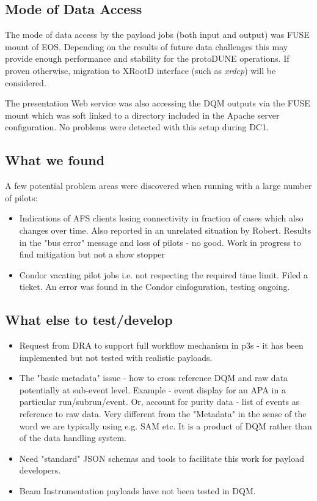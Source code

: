 \documentclass[pdftex,12pt,letter]{article}
\newcommand{\pd}{protoDUNE\xspace}
\begin{document}
\subsection{Mode of Data Access}
The mode of data access by the payload jobs (both input and output) was FUSE mount of EOS.
Depending on the results of future data challenges this may provide enough performance and
stability for the \pd operations. If proven otherwise, migration to XRootD interface (such as \textit{xrdcp})
will be considered.

The presentation Web service was also accessing the DQM outputs via the FUSE mount which was 
soft linked to a directory included in the Apache server configuration. No problems were detected
with this setup during DC1.



\subsection{What we found}
\label{sec:p3s_issues}
A few potential problem areas were discovered when running with a large number of pilots:
\begin{itemize}
\item Indications of AFS clients losing connectivity in fraction of cases which also changes over time. Also reported in an unrelated situation by Robert. Results in the "bus error" message and loss of pilots - no good. Work in progress to find mitigation but not a show stopper
\item Condor vacating pilot jobs i.e. not respecting the required time limit. Filed a ticket. An error was found in the Condor cinfoguration, testing ongoing.
\end{itemize}

 
\subsection{What else to test/develop}

\begin{itemize}
\item Request from DRA to support full workflow mechanism in p3s - it has been implemented but not tested with realistic payloads.
\item The "basic metadata" issue - how to cross reference DQM and raw data potentially at sub-event level. Example - event display for an APA in a particular run/subrun/event. Or, account for purity data - list of events as reference to raw data.
Very different from the "Metadata" in the sense of the word we are typically using e.g. SAM etc. It is a product of DQM rather than of the data handling system.
\item Need "standard" JSON schemas and tools to facilitate this work for payload developers.
\item Beam Instrumentation payloads have not been tested in DQM.
\end{itemize}
\end{document}
